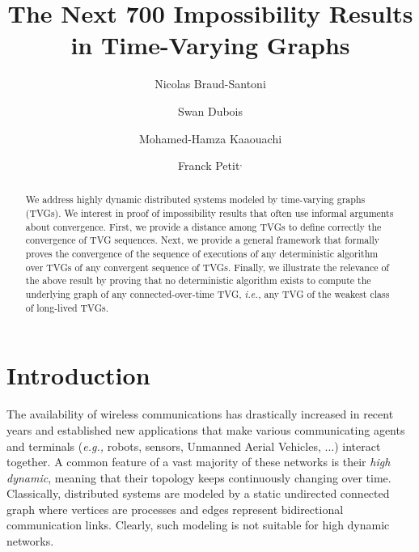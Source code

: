 \documentclass[11pt]{article}
\newcommand{\ie}{{\em i.e.,}\xspace}
\newcommand{\eg}{{\em e.g.,}\xspace}
\begin{document}
\title{The Next 700 Impossibility Results in Time-Varying Graphs}

\renewcommand*{\thefootnote}{\fnsymbol{footnote}}

\author{
Nicolas Braud-Santoni\footnotemark[1]
\and
Swan Dubois\footnotemark[2]
\and
Mohamed-Hamza Kaaouachi\footnotemark[2]
\and 
Franck Petit\footnotemark[2] $^,$\footnotemark[3]
}


\renewcommand*{\thefootnote}{\arabic{footnote}}
\setcounter{footnote}{0}

\date{}
\maketitle

\begin{abstract}
We address highly dynamic distributed systems modeled by time-varying graphs (TVGs). We interest in proof of impossibility results that often use informal arguments about convergence. First, we provide a distance among TVGs to define correctly the convergence of TVG sequences. Next, we provide a general framework that formally proves the convergence of the sequence of executions of any deterministic algorithm over TVGs of any convergent sequence of TVGs. Finally, we illustrate the relevance of the above result by proving that no deterministic algorithm exists to compute the underlying graph of any connected-over-time TVG, \ie any TVG of the weakest class of long-lived TVGs.
\end{abstract}

\section{Introduction}\label{sec:intro}

The availability of wireless communications has drastically increased in recent years and established new applications
that make various communicating agents and terminals (\eg robots, sensors, Unmanned Aerial Vehicles, ...) interact
together. A common feature of a vast majority of these networks is their {\em high
dynamic}, meaning that their topology keeps continuously changing over time.  
Classically, distributed systems are
modeled by a static undirected connected graph where vertices are processes and edges represent bidirectional
communication links.  Clearly, such modeling is not suitable for high dynamic networks.  
\end{document}
